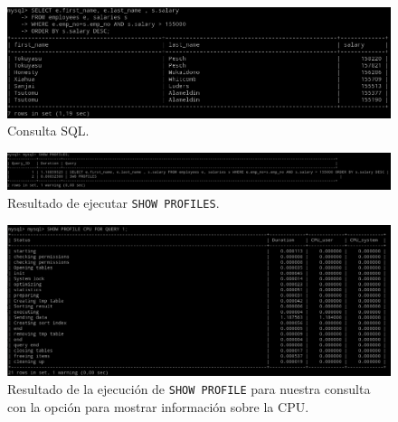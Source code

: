 \begin{figure}[H]
  \begin{center}
    \includegraphics[width=1\textwidth]{imagenes/consulta}
    \caption{Consulta SQL.}
    \label{fig26}
  \end{center}
\end{figure}

\begin{figure}[H]
  \begin{center}
    \includegraphics[width=1\textwidth]{imagenes/profs}
    \caption{Resultado de ejecutar \texttt{SHOW PROFILES}.}
    \label{fig27}
  \end{center}
\end{figure}

\begin{figure}[H]
  \begin{center}
    \includegraphics[width=1\textwidth]{imagenes/mpr}
    \caption{Resultado de la ejecución de \texttt{SHOW PROFILE} para nuestra consulta con la opción para mostrar información sobre la CPU.}
    \label{fig28}
  \end{center}
\end{figure}

\newpage




